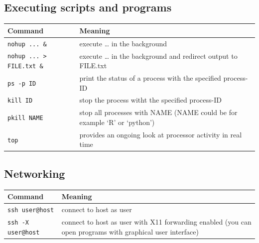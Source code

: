 \documentclass[11pt]{article}
\begin{document}
\subsection{Executing scripts and programs}
\label{sec-7-4}


\begin{center}
\begin{tabular}{ll}
 Command                           &  Meaning                                                                   \\
\hline
 \texttt{nohup ... \&}             &  execute \ldots{} in the background                                        \\
\hline
 \texttt{nohup ... > FILE.txt \&}  &  execute \ldots{} in the background and redirect output to FILE.txt        \\
\hline
 \texttt{ps -p ID}                 &  print the status of a process with the specified process-ID               \\
\hline
 \texttt{kill ID}                  &  stop the process witht the specified process-ID                           \\
\hline
 \texttt{pkill NAME}               &  stop all processes with NAME (NAME could be for example `R' or `python')  \\
\hline
 \texttt{top}                      &  provides an ongoing look at processor activity in real time               \\
\end{tabular}
\end{center}
\subsection{Networking}
\label{sec-7-5}


\begin{center}
\begin{tabular}{ll}
 Command                    &  Meaning                                                                                                    \\
\hline
 \texttt{ssh user@host}     &  connect to host as user                                                                                    \\
\hline
 \texttt{ssh -X user@host}  &  connect to host as user with X11 forwarding enabled (you can open programs with graphical user interface)  \\
\end{tabular}
\end{center}
\end{document}
